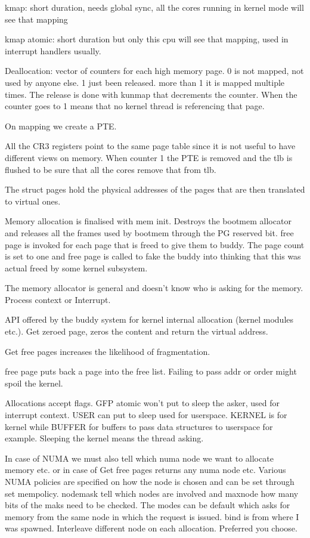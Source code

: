 \documentclass[twoside]{article}
\begin{document}
kmap: short duration, needs global sync, all the cores running in kernel mode will see that mapping

kmap atomic: short duration but only this cpu will see that mapping, used in interrupt handlers usually. 

Deallocation: vector of counters for each high memory page. 0 is not mapped, not used by anyone else. 1 just been released. more than 1 it is mapped multiple times. The release is done with kunmap that decrements the counter. When the counter goes to 1 means that no kernel thread is referencing that page.

On mapping we create a PTE.

All the CR3 registers point to the same page table since it is not useful to have different views on memory. When counter 1 the PTE is removed and the tlb is flushed to be sure that all the cores remove that from tlb. 

The struct pages hold the physical addresses of the pages that are then translated to virtual ones.

Memory allocation is finalised with mem init. Destroys the bootmem allocator and releases all the frames used by bootmem through the PG reserved bit. free page is invoked for each page that is freed to give them to buddy. The page count is set to one and free page is called to fake the buddy into thinking that this was actual freed by some kernel subsystem.

The memory allocator is general and doesn't know who is asking for the memory. Process context or Interrupt.

API offered by the buddy system for kernel internal allocation (kernel modules etc.). Get zeroed page, zeros the content and return the virtual address.

Get free pages increases the likelihood of fragmentation.

free page puts back a page into the free list. Failing to pass addr or order might spoil the kernel.


Allocations accept flags. GFP atomic won't put to sleep the asker, used for interrupt context. USER can put to sleep used for userspace. KERNEL is for kernel while BUFFER for buffers to pass data structures to userspace for example. Sleeping the kernel means the thread asking.

In case of NUMA we must also tell which numa node we want to allocate memory etc. or in case of Get free pages returns any numa node etc. Various NUMA policies are specified on how the node is chosen and can be set through set mempolicy. nodemask tell which nodes are involved and maxnode how many bits of the maks need to be checked. The modes can be default which asks for memory from the same node in which the request is issued. bind is from where I was spawned. Interleave different node on each allocation. Preferred you choose.
\end{document}
